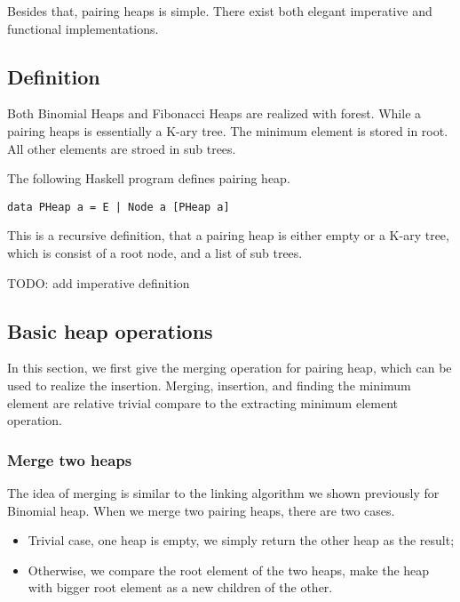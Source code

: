 \documentclass{article}
\begin{document}
Besides that, pairing heaps is simple. There exist both elegant 
imperative and functional implementations. 

\subsection{Definition}
\label{pairing-heap!definition}

Both Binomial Heaps and Fibonacci Heaps are realized with forest. 
While a pairing heaps is essentially a K-ary tree. The minimum element
is stored in root. All other elements are stroed in sub trees.

The following Haskell program defines pairing heap.

\lstset{language=Haskell}
\begin{lstlisting}
data PHeap a = E | Node a [PHeap a]
\end{lstlisting}

This is a recursive definition, that a pairing heap is either empty
or a K-ary tree, which is consist of a root node, and a list of sub trees.

TODO: add imperative definition


\subsection{Basic heap operations}
In this section, we first give the merging operation for pairing
heap, which can be used to realize the insertion. Merging, insertion,
and finding the minimum element are relative trivial compare to
the extracting minimum element operation.

\subsubsection{Merge two heaps}
The idea of merging is similar to the linking algorithm we shown
previously for Binomial heap. When we merge two pairing heaps, there
are two cases.

\begin{itemize}
\item Trivial case, one heap is empty, we simply return the other 
heap as the result;

\item Otherwise, we compare the root element of the two heaps, make
the heap with bigger root element as a new children of the other.
\end{itemize}
\end{document}
